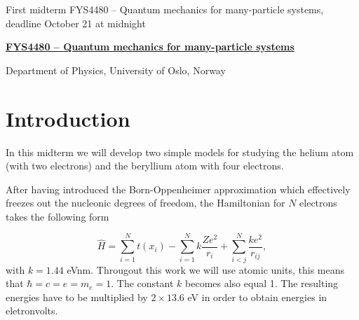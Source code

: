 \documentclass[a4wide,10pt]{article}
\begin{document}

\newcommand{\exercisesection}[1]{\subsection*{#1}}






\thispagestyle{empty}

\begin{center}
{\LARGE\bf
\begin{spacing}{1.25}
First midterm FYS4480 – Quantum mechanics for many-particle systems, deadline October 21 at midnight
\end{spacing}
}
\end{center}


\begin{center}
{\bf \href{{http://www.uio.no/studier/emner/matnat/fys/FYS4480/index-eng.html}}{FYS4480 – Quantum mechanics for many-particle systems}}
\end{center}

    \begin{center}
\centerline{{\small Department of Physics, University of Oslo, Norway}}
\end{center}

\section*{Introduction}

In this midterm we will develop two simple models for studying the 
helium atom (with two electrons) and the beryllium atom with four electrons.

After having introduced the  Born-Oppenheimer approximation which effectively freezes out the nucleonic degrees
of freedom, the Hamiltonian for $N$ electrons takes the following form

\begin{equation*}
  \hat{H} = \sum_{i=1}^{N} t(x_i) 
  - \sum_{i=1}^{N} k\frac{Ze^2}{r_i} + \sum_{i<j}^{N} \frac{ke^2}{r_{ij}},
\end{equation*}
with $k=1.44$ eVnm. Througout this work we will use atomic units, this means
that $\hbar=c=e=m_e=1$. The constant $k$ becomes also equal 1. 
The resulting energies have to be multiplied by $2\times 13.6$ eV
in order to obtain energies in eletronvolts.
\end{document}
